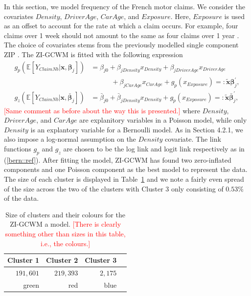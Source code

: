 \documentclass[11pt,letterpaper]{article}
\numberwithin{equation}{section}
\numberwithin{equation}{section}
\numberwithin{equation}{section}
\newcommand{\xTilda}{\tilde{\bm{x}}}
\begin{document}
In this section, we model frequency of the French motor claims. We consider the covariates $Density$, $DriverAge$, $CarAge$, and $Exposure$. Here, $Exposure$ is used as an offset to account for the rate at which a claim occurs. For example, four claims over 1 week should not amount to the same as four claims over 1 year \citep{frees2015}. The choice of covariates stems from the previously modelled single component ZIP \citep{Charpentier:2014}.
The ZI-GCWM is fitted with the following expression
\begin{align}
g_p(\mathbb{E}\left[Y_{ClaimNb}|\bm{x}, \bm{\beta}_j \right]) & = 
  \beta_{j0} +  \beta_{jDensity}x_{Density}+ \beta_{jDriverAge}x_{DriverAge} \nonumber \\    &  \quad\quad\quad +  \beta_{jCarAge}x_{CarAge}   + g_p(x_{Exposure})  =: \bm{\xTilda} \bm{\beta}_j^{'},   \label{poissonReg}\\
g_z(\mathbb{E}\left[Y_{ClaimNb}|\bm{x}, \bar{\bm{\beta}}_j \right])& = \bar{\beta}_{j0} +  \bar{\beta}_{jDensity} x_{Density} + g_p(x_{Exposure})  =: \bm{\xTilda} \bar{\bm{\beta}}_j^{'},  \label{zeroReg} 
\end{align}
\textcolor{red}{[Same comment as before about the way this is presented.]}
where $Density$, $DriverAge$, and $CarAge$ are explanitory variables in a Poisson model, while only $Density$ is an explantory variable for a Bernoulli model. As in Section 4.2.1, we also impose a log-normal assumption on the $Density$ covariate. The link functions $g_p$ and $g_z$ are chosen to be the log link and logit link respectively as in (\ref{bern::ref}).
After fitting the model, ZI-GCWM has found two zero-inflated components and one Poisson component as the best model to represent the data. The size of each cluster is displayed in Table~\ref{table:sizeFreq} and we note a fairly even spread of the size across the two of the clusters with Cluster 3 only consisting of $0.53 \%$ of the data.
\begin{table}[!htb]
\centering
\caption{Size of clusters and their colours for the ZI-GCWM a model. \textcolor{red}{[There is clearly something other than sizes in this table, i.e., the colours.]}}
\label{table:sizeFreq}
\begin{tabular}{rrrr}
\hline
Cluster 1   & Cluster 2  & Cluster 3   \\
\hline
$191,601$& $219,393$ & $2,175$ \\
green & red & blue  \\
\hline
\end{tabular}
\end{table}
\end{document}
